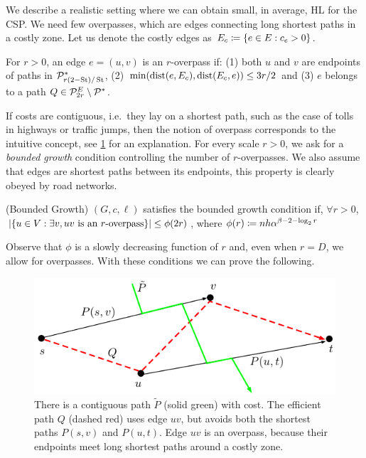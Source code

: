 We describe a realistic setting where we can obtain small, in average, HL for the CSP.
We need few overpasses, which are edges connecting long shortest paths in a costly zone.
Let us denote the costly edges as $E_c\coloneqq\{e\in E:c_e>0\}$.

\begin{definition}[Overpass]
For $r>0$, an edge $e=(u,v)$ is an $r$-overpass if: (1) both $u$ and $v$ are endpoints of paths in $\mathcal{P}^*_{r(2-\operatorname{St})/\operatorname{St}}$, (2) $\min(\mbox{dist}(e,E_c),\mbox{dist}(E_c,e))\leq 3r/2$ and (3) $e$ belongs to a path $Q\in\mathcal{P}^E_{2r}\setminus\mathcal{P}^*$.
\end{definition} 

If costs are contiguous, i.e.\ they lay on a shortest path, such as the case of tolls in highways or traffic jumps, then the notion of overpass corresponds to the intuitive concept, see \cref{fig:overpass} for an explanation.
For every scale $r>0$, we ask for a \emph{bounded growth} condition controlling the number of $r$-overpasses.
We also assume that edges are shortest paths between its endpoints, this property is clearly obeyed by road networks.

\begin{definition}(Bounded Growth)
$(G,c,\ell)$ satisfies the bounded growth condition if, $\forall r>0$, $\lvert\{u\in V: \exists v, uv \text{ is an $r$-overpass}\}\rvert\leq \phi(2r)$, where $\phi(r)\coloneqq nh\alpha^{\beta-2-\log_2r}$
\end{definition}

Observe that $\phi$ is a slowly decreasing function of $r$ and, even when $r=D$, we allow for overpasses.
With these conditions we can prove the following.

\begin{figure}
\includegraphics[scale=0.6]{TexImg/overpass.pdf}
\caption{There is a contiguous path $\tilde P$ (solid green) with cost. 
The efficient path $Q$ (dashed red) uses edge $uv$, but avoids both the shortest paths $P(s,v)$ and $P(u,t)$.
Edge $uv$ is an overpass, because their endpoints meet long shortest paths around a costly zone.} 
\label{fig:overpass}
\end{figure}


